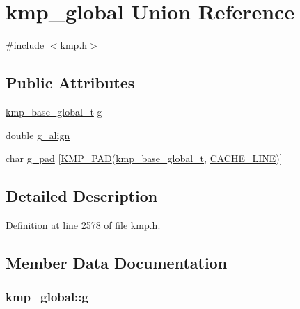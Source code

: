 \hypertarget{unionkmp__global}{\section{kmp\-\_\-global Union Reference}
\label{unionkmp__global}
}


{\ttfamily \#include $<$kmp.\-h$>$}

\subsection*{Public Attributes}
\begin{DoxyCompactItemize}
\item 
\hyperlink{kmp_8h_a15e0eaa9478a56cc0f765900770f08ea}{kmp\-\_\-base\-\_\-global\-\_\-t} \hyperlink{unionkmp__global_ac47831a8af59cf9171e22557a79d6cef}{g}
\item 
double \hyperlink{unionkmp__global_a438f9e2a578361527edbb0d9c4dbc9f7}{g\-\_\-align}
\item 
char \hyperlink{unionkmp__global_a264fc6cbbde29a63dff78ebcc602c068}{g\-\_\-pad} \mbox{[}\hyperlink{kmp__lock_8h_a7e782410115489f45ab1686c39a2bb89}{K\-M\-P\-\_\-\-P\-A\-D}(\hyperlink{kmp_8h_a15e0eaa9478a56cc0f765900770f08ea}{kmp\-\_\-base\-\_\-global\-\_\-t}, \hyperlink{kmp__os_8h_a86194c659a2d795e5f5949d293ae4661}{C\-A\-C\-H\-E\-\_\-\-L\-I\-N\-E})\mbox{]}
\end{DoxyCompactItemize}


\subsection{Detailed Description}


Definition at line 2578 of file kmp.\-h.



\subsection{Member Data Documentation}
\hypertarget{unionkmp__global_ac47831a8af59cf9171e22557a79d6cef}{
\subsubsection[{g}]{ kmp\-\_\-global\-::g}}\label{unionkmp__global_ac47831a8af59cf9171e22557a79d6cef}


